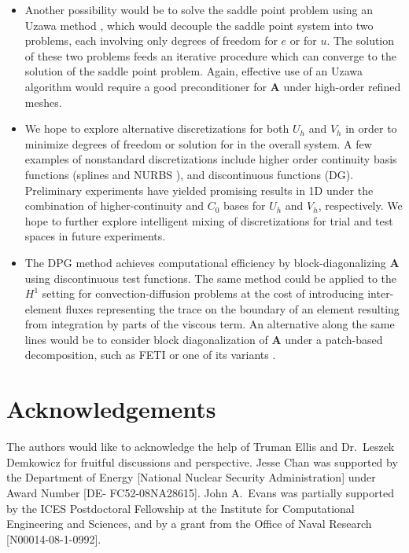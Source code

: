 \documentclass[final,leqno]{siamltex}
\newcommand{\bs}[1]{\boldsymbol{#1}}
\begin{document}
\begin{itemize}
\item Another possibility would be to solve the saddle point problem using an Uzawa method \cite{uzawa}, which would decouple the saddle point system into two problems, each involving only degrees of freedom for $e$ or for $u$.  The solution of these two problems feeds an iterative procedure which can converge to the solution of the saddle point problem.  Again, effective use of an Uzawa algorithm would require a good preconditioner for $\bs{A}$ under high-order refined meshes.
\item We hope to explore alternative discretizations for both $U_h$ and $V_h$ in order to minimize degrees of freedom or solution for in the overall system.  A few examples of nonstandard discretizations include higher order continuity basis functions (splines and NURBS \cite{NURBSorig}), and discontinuous functions (DG).  Preliminary experiments have yielded promising results in 1D under the combination of higher-continuity and $C_0$ bases for $U_h$ and $V_h$, respectively.  We hope to further explore intelligent mixing of discretizations for trial and test spaces in future experiments.  
\item The DPG method achieves computational efficiency by block-diagonalizing $\bs{A}$ using discontinuous test functions.  The same method could be applied to the $H^1$ setting for convection-diffusion problems at the cost of introducing inter-element fluxes representing the trace on the boundary of an element resulting from integration by parts of the viscous term.  An alternative along the same lines would be to consider block diagonalization of $\bs{A}$ under a patch-based decomposition, such as FETI or one of its variants \cite{FETI1,FETI2}.  
\end{itemize}

\section{Acknowledgements}

The authors would like to acknowledge the help of Truman Ellis and Dr.\ Leszek Demkowicz for fruitful discussions and perspective.  Jesse Chan was supported by the Department of Energy [National Nuclear Security Administration] under Award Number [DE- FC52-08NA28615].  John A.\ Evans was partially supported by the ICES Postdoctoral Fellowship at the Institute for Computational Engineering and Sciences, and by a grant from the Office of Naval Research [N00014-08-1-0992].



\end{document}
